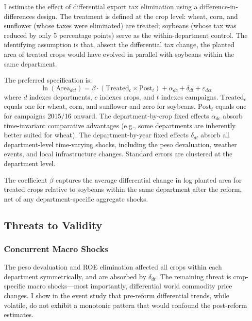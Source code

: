 \documentclass[12pt]{article}
\begin{document}
I estimate the effect of differential export tax elimination using a difference-in-differences design. The treatment is defined at the crop level: wheat, corn, and sunflower (whose taxes were eliminated) are treated; soybeans (whose tax was reduced by only 5 percentage points) serve as the within-department control. The identifying assumption is that, absent the differential tax change, the planted area of treated crops would have evolved in parallel with soybeans within the same department.

The preferred specification is:
\begin{equation}
\ln(\text{Area}_{dct}) = \beta \cdot (\text{Treated}_c \times \text{Post}_t) + \alpha_{dc} + \delta_{dt} + \varepsilon_{dct}
\label{eq:main}
\end{equation}
where $d$ indexes departments, $c$ indexes crops, and $t$ indexes campaigns. $\text{Treated}_c$ equals one for wheat, corn, and sunflower and zero for soybeans. $\text{Post}_t$ equals one for campaigns 2015/16 onward. The department-by-crop fixed effects $\alpha_{dc}$ absorb time-invariant comparative advantages (e.g., some departments are inherently better suited for wheat). The department-by-year fixed effects $\delta_{dt}$ absorb all department-level time-varying shocks, including the peso devaluation, weather events, and local infrastructure changes. Standard errors are clustered at the department level.

The coefficient $\beta$ captures the average differential change in log planted area for treated crops relative to soybeans within the same department after the reform, net of any department-specific aggregate shocks.

\subsection{Threats to Validity}

\subsubsection*{Concurrent Macro Shocks} The peso devaluation and ROE elimination affected all crops within each department symmetrically, and are absorbed by $\delta_{dt}$. The remaining threat is crop-specific macro shocks---most importantly, differential world commodity price changes. I show in the event study that pre-reform differential trends, while volatile, do not exhibit a monotonic pattern that would confound the post-reform estimates.
\end{document}
